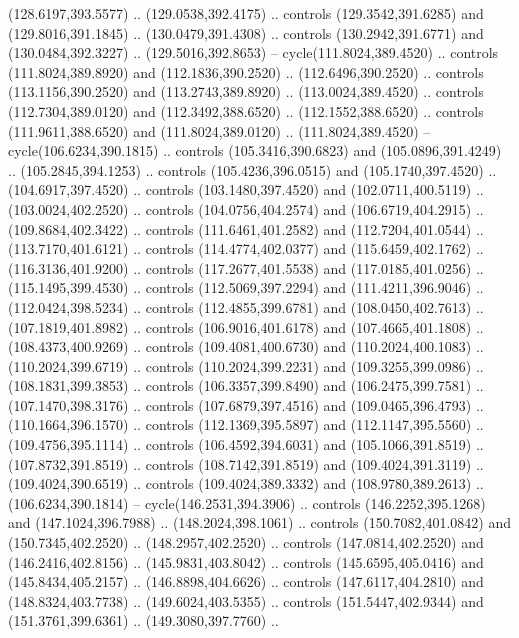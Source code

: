 \begin{scope}[cm={{1.25,0.0,0.0,-1.25,(0.0,743.43331)}}]
    (128.6197,393.5577) .. (129.0538,392.4175) .. controls (129.3542,391.6285) and
    (129.8016,391.1845) .. (130.0479,391.4308) .. controls (130.2942,391.6771) and
    (130.0484,392.3227) .. (129.5016,392.8653) -- cycle(111.8024,389.4520) ..
    controls (111.8024,389.8920) and (112.1836,390.2520) .. (112.6496,390.2520) ..
    controls (113.1156,390.2520) and (113.2743,389.8920) .. (113.0024,389.4520) ..
    controls (112.7304,389.0120) and (112.3492,388.6520) .. (112.1552,388.6520) ..
    controls (111.9611,388.6520) and (111.8024,389.0120) .. (111.8024,389.4520) --
    cycle(106.6234,390.1815) .. controls (105.3416,390.6823) and
    (105.0896,391.4249) .. (105.2845,394.1253) .. controls (105.4236,396.0515) and
    (105.1740,397.4520) .. (104.6917,397.4520) .. controls (103.1480,397.4520) and
    (102.0711,400.5119) .. (103.0024,402.2520) .. controls (104.0756,404.2574) and
    (106.6719,404.2915) .. (109.8684,402.3422) .. controls (111.6461,401.2582) and
    (112.7204,401.0544) .. (113.7170,401.6121) .. controls (114.4774,402.0377) and
    (115.6459,402.1762) .. (116.3136,401.9200) .. controls (117.2677,401.5538) and
    (117.0185,401.0256) .. (115.1495,399.4530) .. controls (112.5069,397.2294) and
    (111.4211,396.9046) .. (112.0424,398.5234) .. controls (112.4855,399.6781) and
    (108.0450,402.7613) .. (107.1819,401.8982) .. controls (106.9016,401.6178) and
    (107.4665,401.1808) .. (108.4373,400.9269) .. controls (109.4081,400.6730) and
    (110.2024,400.1083) .. (110.2024,399.6719) .. controls (110.2024,399.2231) and
    (109.3255,399.0986) .. (108.1831,399.3853) .. controls (106.3357,399.8490) and
    (106.2475,399.7581) .. (107.1470,398.3176) .. controls (107.6879,397.4516) and
    (109.0465,396.4793) .. (110.1664,396.1570) .. controls (112.1369,395.5897) and
    (112.1147,395.5560) .. (109.4756,395.1114) .. controls (106.4592,394.6031) and
    (105.1066,391.8519) .. (107.8732,391.8519) .. controls (108.7142,391.8519) and
    (109.4024,391.3119) .. (109.4024,390.6519) .. controls (109.4024,389.3332) and
    (108.9780,389.2613) .. (106.6234,390.1814) -- cycle(146.2531,394.3906) ..
    controls (146.2252,395.1268) and (147.1024,396.7988) .. (148.2024,398.1061) ..
    controls (150.7082,401.0842) and (150.7345,402.2520) .. (148.2957,402.2520) ..
    controls (147.0814,402.2520) and (146.2416,402.8156) .. (145.9831,403.8042) ..
    controls (145.6595,405.0416) and (145.8434,405.2157) .. (146.8898,404.6626) ..
    controls (147.6117,404.2810) and (148.8324,403.7738) .. (149.6024,403.5355) ..
    controls (151.5447,402.9344) and (151.3761,399.6361) .. (149.3080,397.7760) ..

\end{scope}
